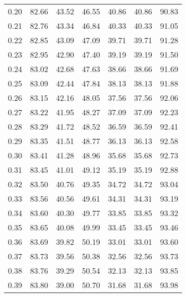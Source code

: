 \begin{tabular}{|c|c|c|c|c|c|c|}
      0.20 &     82.66 &     43.52 &      46.55 &   40.86 &      40.86 &         90.83 \\
      0.21 &     82.76 &     43.34 &      46.84 &   40.33 &      40.33 &         91.05 \\
      0.22 &     82.85 &     43.09 &      47.09 &   39.71 &      39.71 &         91.28 \\
      0.23 &     82.95 &     42.90 &      47.40 &   39.19 &      39.19 &         91.50 \\
      0.24 &     83.02 &     42.68 &      47.63 &   38.66 &      38.66 &         91.69 \\
      0.25 &     83.09 &     42.44 &      47.84 &   38.13 &      38.13 &         91.88 \\
      0.26 &     83.15 &     42.16 &      48.05 &   37.56 &      37.56 &         92.06 \\
      0.27 &     83.22 &     41.95 &      48.27 &   37.09 &      37.09 &         92.23 \\
      0.28 &     83.29 &     41.72 &      48.52 &   36.59 &      36.59 &         92.41 \\
      0.29 &     83.35 &     41.51 &      48.77 &   36.13 &      36.13 &         92.58 \\
      0.30 &     83.41 &     41.28 &      48.96 &   35.68 &      35.68 &         92.73 \\
      0.31 &     83.45 &     41.01 &      49.12 &   35.19 &      35.19 &         92.88 \\
      0.32 &     83.50 &     40.76 &      49.35 &   34.72 &      34.72 &         93.04 \\
      0.33 &     83.56 &     40.56 &      49.61 &   34.31 &      34.31 &         93.19 \\
      0.34 &     83.60 &     40.30 &      49.77 &   33.85 &      33.85 &         93.32 \\
      0.35 &     83.65 &     40.08 &      49.99 &   33.45 &      33.45 &         93.46 \\
      0.36 &     83.69 &     39.82 &      50.19 &   33.01 &      33.01 &         93.60 \\
      0.37 &     83.73 &     39.56 &      50.38 &   32.56 &      32.56 &         93.73 \\
      0.38 &     83.76 &     39.29 &      50.54 &   32.13 &      32.13 &         93.85 \\
      0.39 &     83.80 &     39.00 &      50.70 &   31.68 &      31.68 &         93.98 \\

\end{tabular}
